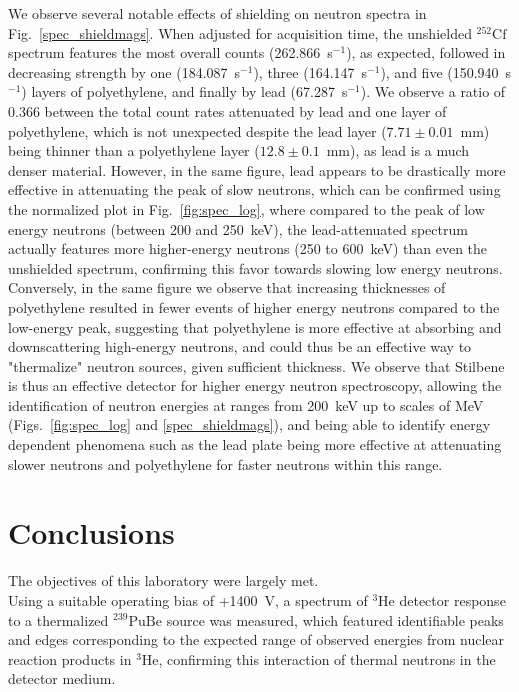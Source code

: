 \documentclass[12pt]{article}
\newcommand{\figref}[1]{Fig.~\ref{#1}}
\newcommand{\PuBe}{$\mathrm{^{239}PuBe}$\xspace}
\newcommand{\CfSrc}{$\mathrm{^{252}Cf}$\xspace}
\newcommand{\HeThree}{$\mathrm{^3He}$\xspace}
\begin{document}
\newcommand{\isec}{s$^{-1}$}
We observe several notable effects of shielding on neutron spectra in \figref{spec_shieldmags}.
When adjusted for acquisition time, the unshielded \CfSrc spectrum features the most overall counts (262.866~\isec), as expected, followed in decreasing strength by one (184.087~\isec), three (164.147~\isec), and five (150.940~\isec) layers of polyethylene, and finally by lead (67.287~\isec).
We observe a ratio of 0.366 between the total count rates attenuated by lead and one layer of polyethylene, which is not unexpected despite the lead layer ($7.71\pm0.01$~mm) being thinner than a polyethylene layer ($12.8\pm0.1$~mm), as lead is a much denser material.
However, in the same figure, lead appears to be drastically more effective in attenuating the peak of slow neutrons, which can be confirmed using the normalized plot in \figref{fig:spec_log}, where compared to the peak of low energy neutrons (between 200 and 250~keV), the lead-attenuated spectrum actually features more higher-energy neutrons (250 to 600~keV) than even the unshielded spectrum, confirming this favor towards slowing low energy neutrons.
Conversely, in the same figure we observe that increasing thicknesses of polyethylene resulted in fewer events of higher energy neutrons compared to the low-energy peak, suggesting that polyethylene is more effective at absorbing and downscattering high-energy neutrons, and could thus be an effective way to "thermalize" neutron sources, given sufficient thickness.
We observe that Stilbene is thus an effective detector for higher energy neutron spectroscopy, allowing the identification of neutron energies at ranges from 200~keV up to scales of MeV (Figs.~\ref{fig:spec_log} and \ref{spec_shieldmags}), and being able to identify energy dependent phenomena such as the lead plate being more effective at attenuating slower neutrons and polyethylene for faster neutrons within this range.


\section{Conclusions}\label{sec:conc}

The objectives of this laboratory were largely met.\\

Using a suitable operating bias of +1400~V, a spectrum of \HeThree detector response to a thermalized \PuBe source was measured, which featured identifiable peaks and edges corresponding to the expected range of observed energies from nuclear reaction products in \HeThree, confirming this interaction of thermal neutrons in the detector medium.\\
\end{document}
